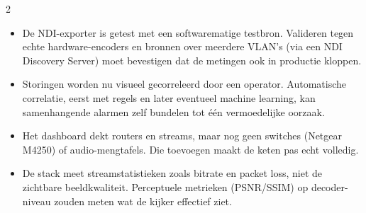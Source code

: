 \documentclass[a0,portrait]{hogent-poster}
\begin{document}
\begin{multicols}{2}
\begin{itemize}
  \item De NDI-exporter is getest met een softwarematige testbron. Valideren tegen echte hardware-encoders en bronnen over meerdere VLAN's (via een NDI Discovery Server) moet bevestigen dat de metingen ook in productie kloppen.
  \item Storingen worden nu visueel gecorreleerd door een operator. Automatische correlatie, eerst met regels en later eventueel machine learning, kan samenhangende alarmen zelf bundelen tot \'e\'en vermoedelijke oorzaak.
  \item Het dashboard dekt routers en streams, maar nog geen switches (Netgear M4250) of audio-mengtafels. Die toevoegen maakt de keten pas echt volledig.
  \item De stack meet streamstatistieken zoals bitrate en packet loss, niet de zichtbare beeldkwaliteit. Perceptuele metrieken (PSNR/SSIM) op decoder-niveau zouden meten wat de kijker effectief ziet.
\end{itemize}

\end{multicols}
\end{document}
